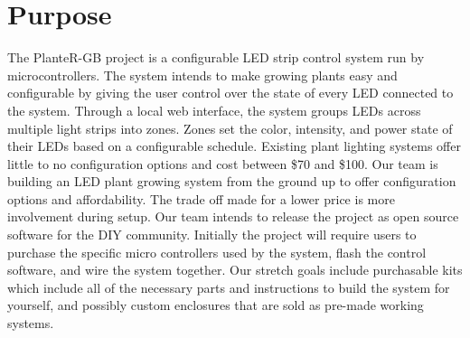 \documentclass[onecolumn, draftclsnofoot,10pt, compsoc]{IEEEtran}
\begin{document}
\newpage

\tableofcontents
\clearpage
\singlespace

\newpage





%


	\section{Purpose}
	The PlanteR-GB project is a configurable LED strip control system run by microcontrollers.
	The system intends to make growing plants easy and configurable by giving the user control over the state of every LED connected to the system.
	Through a local web interface, the system groups LEDs across multiple light strips into zones.
	Zones set the color, intensity, and power state of their LEDs based on a configurable schedule.
	Existing plant lighting systems offer little to no configuration options and cost between \$70 and \$100. \cite{expensive1} \cite{expensive2} \cite{expensive3}
	Our team is building an LED plant growing system from the ground up to offer configuration options and affordability.
	The trade off made for a lower price is more involvement during setup. Our team intends to release the project as open source software for the DIY community.
	Initially the project will require users to purchase the specific micro controllers used by the system, flash the control software, and wire the system together.
	Our stretch goals include purchasable kits which include all of the necessary parts and instructions to build the system for yourself, and possibly custom enclosures that are sold as pre-made working systems.
\end{document}
